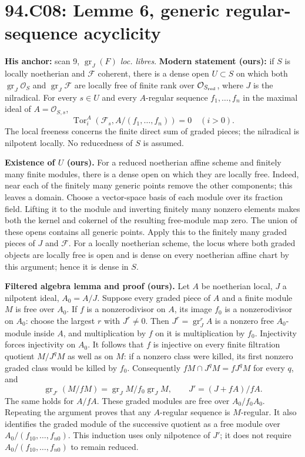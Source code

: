 \documentclass[11pt]{article}
\newcommand{\Tor}{\operatorname{Tor}}
\begin{document}
\section{94.C08: Lemme 6, generic regular-sequence acyclicity}
\label{C08}
\textbf{His anchor:} scan 9, \emph{$\operatorname{gr}_J(F)$ loc. libres}.
\textbf{Modern statement (ours):} if $S$ is locally noetherian and
$\mathcal F$ coherent, there is a dense open $U\subset S$ on which
both $\operatorname{gr}_J\mathcal O_S$ and
$\operatorname{gr}_J\mathcal F$ are locally free of finite rank over
$\mathcal O_{S_{\rm red}}$, where $J$ is the nilradical. For every
$s\in U$ and every $A$-regular sequence $f_1,\ldots,f_n$ in the
maximal ideal of $A=\mathcal O_{S,s}$,
\[
 \Tor_i^A(\mathcal F_s,A/(f_1,\ldots,f_n))=0\quad(i>0).
\]
The local freeness concerns the finite direct sum of graded pieces;
the nilradical is nilpotent locally. No reducedness of $S$ is assumed.

\textbf{Existence of $U$ (ours).}
For a reduced noetherian affine scheme and finitely many finite
modules, there is a dense open on which they are locally free.
Indeed, near each of the finitely many generic points remove the
other components; this leaves a domain. Choose a vector-space basis
of each module over its fraction field. Lifting it to the module
and inverting finitely many nonzero elements makes both the kernel
and cokernel of the resulting free-module map zero. The union of
these opens contains all generic points. Apply this to the finitely
many graded pieces of $J$ and $\mathcal F$. For a locally noetherian
scheme, the locus where both graded objects are locally free is open
and is dense on every noetherian affine chart by this argument; hence
it is dense in $S$.

\textbf{Filtered algebra lemma and proof (ours).}
Let $A$ be noetherian local, $J$ a nilpotent ideal, $A_0=A/J$.
Suppose every graded piece of $A$ and a finite module $M$ is free over
$A_0$. If $f$ is a nonzerodivisor on $A$, its image $f_0$ is a
nonzerodivisor on $A_0$: choose the largest $r$ with $J^r\ne0$.
Then $J^r=\operatorname{gr}_J^r A$ is a nonzero free $A_0$-module
inside $A$, and multiplication by $f$ on it is multiplication by
$f_0$. Injectivity forces injectivity on $A_0$.
It follows that $f$ is injective on every finite filtration quotient
$M/J^qM$ as well as on $M$: if a nonzero class were killed, its first
nonzero graded class would be killed by $f_0$. Consequently
$fM\cap J^qM=fJ^qM$ for every $q$, and
\[
 \operatorname{gr}_{J'}(M/fM)
 =\operatorname{gr}_J M/f_0\operatorname{gr}_J M,
 \qquad J'=(J+fA)/fA.
\]
The same holds for $A/fA$. These graded modules are free over
$A_0/f_0A_0$. Repeating the argument proves that any $A$-regular
sequence is $M$-regular. It also identifies the graded module of the
successive quotient as a free module over
$A_0/(f_{10},\ldots,f_{n0})$. This induction uses only nilpotence of
$J'$; it does not require $A_0/(f_{10},\ldots,f_{n0})$ to remain reduced.
\end{document}
